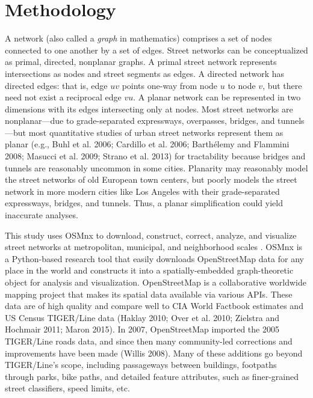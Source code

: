 \documentclass{article}
\begin{document}
\section{Methodology}

A network (also called a \emph{graph} in mathematics) comprises a set of nodes connected to one another by a set of edges. Street networks can be conceptualized as primal, directed, nonplanar graphs. A primal street network represents intersections as nodes and street segments as edges. A directed network has directed edges: that is, edge $uv$ points one-way from node $u$ to node $v$, but there need not exist a reciprocal edge $vu$. A planar network can be represented in two dimensions with its edges intersecting only at nodes. Most street networks are nonplanar---due to grade-separated expressways, overpasses, bridges, and tunnels---but most quantitative studies of urban street networks represent them as planar (e.g., Buhl et al. 2006; Cardillo et al. 2006; Barthélemy and Flammini 2008; Masucci et al. 2009; Strano et al. 2013) for tractability because bridges and tunnels are reasonably uncommon in some cities. Planarity may reasonably model the street networks of old European town centers, but poorly models the street network in more modern cities like Los Angeles with their grade-separated expressways, bridges, and tunnels. Thus, a planar simplification could yield inaccurate analyses.

This study uses OSMnx to download, construct, correct, analyze, and visualize street networks at metropolitan, municipal, and neighborhood scales \cite{boeing_osmnx:_2017}. OSMnx is a Python-based research tool that easily downloads OpenStreetMap data for any place in the world and constructs it into a spatially-embedded graph-theoretic object for analysis and visualization. OpenStreetMap is a collaborative worldwide mapping project that makes its spatial data available via various APIs. These data are of high quality and compare well to CIA World Factbook estimates and US Census TIGER/Line data (Haklay 2010; Over et al. 2010; Zielstra and Hochmair 2011; Maron 2015). In 2007, OpenStreetMap imported the 2005 TIGER/Line roads data, and since then many community-led corrections and improvements have been made (Willis 2008). Many of these additions go beyond TIGER/Line's scope, including passageways between buildings, footpaths through parks, bike paths, and detailed feature attributes, such as finer-grained street classifiers, speed limits, etc.
\end{document}
